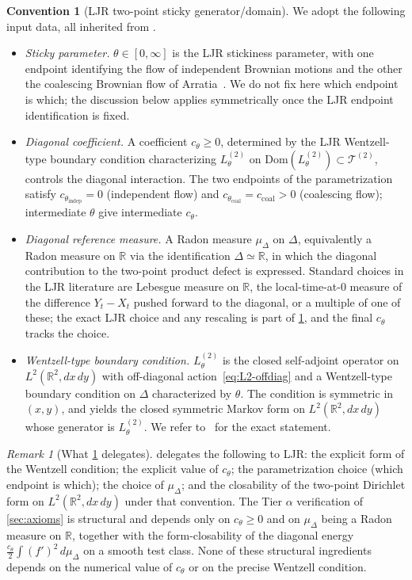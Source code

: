 \documentclass[11pt,reqno]{amsart}
\theoremstyle{plain}
\theoremstyle{definition}
\newtheorem{convention}[theorem]{Convention}
\theoremstyle{remark}
\newtheorem{remark}[theorem]{Remark}
\newcommand{\R}{\mathbb{R}}
\newcommand{\Dom}{\mathrm{Dom}}
\newcommand{\cT}{\mathcal T}
\begin{document}
\begin{convention}[LJR two-point sticky generator/domain]\label{conv:LJR}
We adopt the following input data, all inherited from
\cite{LeJanRaimond2004}.
\begin{itemize}
\item[$(\mathrm a)$] \emph{Sticky parameter.}
$\theta\in[0,\infty]$ is the LJR stickiness parameter, with one
endpoint identifying the flow of independent Brownian motions
and the other the coalescing Brownian flow of
Arratia~\cite{LeJanRaimond2004}. We do not fix here which
endpoint is which; the discussion below applies symmetrically
once the LJR endpoint identification is fixed.
\item[$(\mathrm b)$] \emph{Diagonal coefficient.} A coefficient
$c_{\theta}\ge 0$, determined by the LJR Wentzell-type boundary
condition characterizing $L^{(2)}_{\theta}$ on
$\Dom(L^{(2)}_{\theta})\subset\cT^{(2)}$, controls the diagonal
interaction. The two endpoints of the parametrization satisfy
$c_{\theta_{\mathrm{indep}}}=0$ (independent flow) and
$c_{\theta_{\mathrm{coal}}}=c_{\mathrm{coal}}>0$ (coalescing
flow); intermediate $\theta$ give intermediate $c_{\theta}$.
\item[$(\mathrm c)$] \emph{Diagonal reference measure.} A Radon
measure $\mu_{\Delta}$ on $\Delta$, equivalently a Radon measure
on $\R$ via the identification $\Delta\simeq\R$, in which the
diagonal contribution to the two-point product defect is
expressed. Standard choices in the LJR literature are
Lebesgue measure on $\R$, the local-time-at-$0$ measure of the
difference $Y_{t}-X_{t}$ pushed forward to the diagonal, or a
multiple of one of these; the exact LJR choice and any rescaling
is part of \cref{conv:LJR}, and the final $c_{\theta}$ tracks
the choice.
\item[$(\mathrm d)$] \emph{Wentzell-type boundary condition.}
$L^{(2)}_{\theta}$ is the closed self-adjoint operator on
$L^{2}(\R^{2},dx\,dy)$ with off-diagonal action~\eqref{eq:L2-offdiag}
and a Wentzell-type boundary condition on $\Delta$ characterized
by $\theta$. The condition is symmetric in $(x,y)$, and yields the
closed symmetric Markov form on $L^{2}(\R^{2},dx\,dy)$ whose
generator is $L^{(2)}_{\theta}$. We refer
to~\cite{LeJanRaimond2004} for the exact statement.
\end{itemize}
\end{convention}

\begin{remark}[What \cref{conv:LJR} delegates]\label{rem:conv-delegates}
 delegates the following to LJR: the explicit
form of the Wentzell condition; the explicit value of
$c_{\theta}$; the parametrization choice (which endpoint is
which); the choice of $\mu_{\Delta}$; and the closability of the
two-point Dirichlet form on $L^{2}(\R^{2},dx\,dy)$ under that
convention. The Tier $\alpha$ verification of
\cref{sec:axioms} is structural and depends only on
$c_{\theta}\ge 0$ and on $\mu_{\Delta}$ being a Radon measure on
$\R$, together with the form-closability of the diagonal energy
$\frac{c_{\theta}}{2}\int(f')^{2}\,d\mu_{\Delta}$ on a smooth
test class. None of these structural ingredients depends on the
numerical value of $c_{\theta}$ or on the precise Wentzell
condition.
\end{remark}
\end{document}
